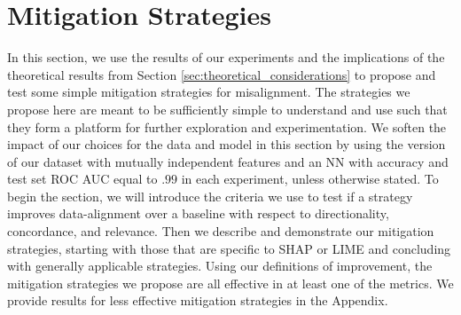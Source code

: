 \documentclass[12pt]{article}  %
\begin{document}
\section{Mitigation Strategies}
    \label{sec:mitigation_strategies}
    In this section, we use the results of our experiments and the implications of the theoretical results from Section \ref{sec:theoretical_considerations} to propose and test some simple mitigation strategies for misalignment. The strategies we propose here are meant to be sufficiently simple to understand and use such that they form a platform for further exploration and experimentation. We soften the impact of our choices for the data and model in this section by using the version of our dataset with mutually independent features and an NN with accuracy and test set ROC AUC equal to $.99$ in each experiment, unless otherwise stated. To begin the section, we will introduce the criteria we use to test if a strategy improves data-alignment over a baseline with respect to directionality, concordance, and relevance. Then we describe and demonstrate our mitigation strategies, starting with those that are specific to SHAP or LIME and concluding with generally applicable strategies. Using our definitions of improvement, the mitigation strategies we propose are all effective in at least one of the metrics. We provide results for less effective mitigation strategies in the Appendix. 

    
\end{document}
